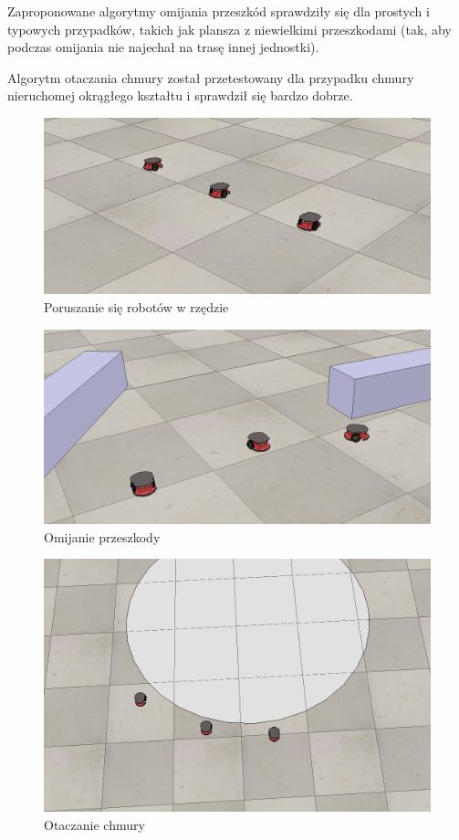 \documentclass[a4paper, 12pt]{article}
\begin{document}
	Zaproponowane algorytmy omijania przeszkód sprawdziły się dla prostych i typowych przypadków, takich jak plansza z niewielkimi przeszkodami (tak, aby podczas omijania nie najechał na trasę innej jednostki).
	
	Algorytm otaczania chmury został przetestowany dla przypadku chmury nieruchomej okrągłego kształtu i sprawdził się bardzo dobrze.
	
	\begin{figure}[h!]
		\centering
		\includegraphics*[width=0.7\columnwidth]{img/rzad_screen.png}
		\caption{Poruszanie się robotów w rzędzie}
		\label{rzad}
	\end{figure}
	\begin{figure}[h!]
		\centering
		\includegraphics*[width=0.7\columnwidth]{img/omijanie_1_screen.png}
		\caption{Omijanie przeszkody}
		\label{omijanie}
	\end{figure}
	\begin{figure}[h!]
		\centering
		\includegraphics*[width=0.7\columnwidth]{img/otaczanie_screen.png}
		\caption{Otaczanie chmury}
		\label{otaczanie_screen}
	\end{figure}

	
	
\end{document}
